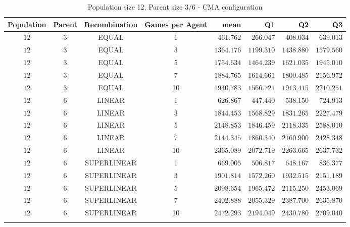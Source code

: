 \begin{table}[H]
\centering
\small
\begin{tabular}{c c c c r r r r}
Population & Parent & Recombination & Games per Agent & mean & Q1 & Q2 & Q3\\
\hline
$12$ & $3$ & EQUAL & 1 & $461.762$ & $266.047$ & $408.034$ & $639.013$\\
$12$ & $3$ & EQUAL & 3 & $1364.176$ & $1199.310$ & $1438.880$ & $1579.560$\\
$12$ & $3$ & EQUAL & 5 & $1754.634$ & $1464.239$ & $1621.035$ & $1945.010$\\
$12$ & $3$ & EQUAL & 7 & $1884.765$ & $1614.661$ & $1800.485$ & $2156.972$\\
\hdashline
$12$ & $3$ & EQUAL & 10 & $1940.783$ & $1566.721$ & $1913.415$ & $2210.251$\\
\hdashline
$12$ & $6$ & LINEAR & 1 & $626.867$ & $447.440$ & $538.150$ & $724.913$\\
$12$ & $6$ & LINEAR & 3 & $1844.453$ & $1568.829$ & $1831.265$ & $2227.479$\\
$12$ & $6$ & LINEAR & 5 & $2148.853$ & $1846.459$ & $2118.335$ & $2588.010$\\
$12$ & $6$ & LINEAR & 7 & $2144.345$ & $1860.340$ & $2160.900$ & $2428.348$\\
\hdashline
$12$ & $6$ & LINEAR & 10 & $2365.089$ & $2072.719$ & $2263.665$ & $2637.732$\\
\hdashline
$12$ & $6$ & SUPERLINEAR & 1 & $669.005$ & $506.817$ & $648.167$ & $836.377$\\
$12$ & $6$ & SUPERLINEAR & 3 & $1901.814$ & $1572.260$ & $1932.515$ & $2151.189$\\
$12$ & $6$ & SUPERLINEAR & 5 & $2098.654$ & $1965.472$ & $2115.250$ & $2453.069$\\
$12$ & $6$ & SUPERLINEAR & 7 & $2402.888$ & $2055.329$ & $2387.700$ & $2635.870$\\
\hdashline
$12$ & $6$ & SUPERLINEAR & 10 & $2472.293$ & $2194.049$ & $2430.780$ & $2709.040$\\
\hdashline
\end{tabular}
\caption{Population size 12, Parent size 3/6 - CMA configuration}
\end{table}


